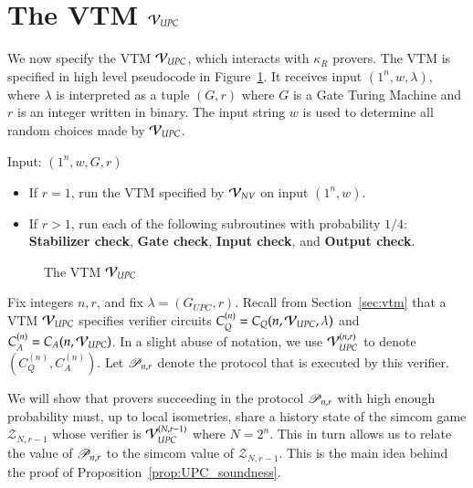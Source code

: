 
\section{The VTM $\mathcal V_{UPC}$}
\label{sec:vtm_upc}

We now specify the VTM $\mathcal V_{UPC}$, which interacts with $\kappa_R$ provers. The VTM is specified in high level pseudocode in Figure~\ref{fig:vtm}. It receives input $(1^n,w,\lambda)$, where $\lambda$ is interpreted as a tuple $(G,r)$ where $G$ is a Gate Turing Machine and $r$ is an integer written in binary. The input string $w$ is used to determine all random choices made by $\mathcal V_{UPC}$.

\begin{center}
\begin{mdframed}
    Input: $(1^n,w,G,r)$
    \begin{itemize}
    	\item If $r = 1$, run the VTM specified by $\mathcal V_{NV}$ on input $(1^n,w)$.
	
		\item If $r > 1$, run each of the following subroutines with probability $1/4$: \textbf{Stabilizer check}, \textbf{Gate check}, \textbf{Input check}, and \textbf{Output check}.
		\end{itemize}
\end{mdframed}

\begin{figure}[H]
\caption{The VTM $\mathcal V_{UPC}$}
\label{fig:vtm}
\end{figure}
\end{center}

Fix integers $n, r$, and fix $\lambda = (G_{UPC},r)$. Recall from Section~\ref{sec:vtm} that a VTM $\mathcal V_{UPC}$ specifies verifier circuits $C_Q^{(n)} = C_Q(n,\mathcal V_{UPC},\lambda)$ and $C_A^{(n)} = C_A(n,\mathcal V_{UPC})$. In a slight abuse of notation, we use $\mathcal V_{UPC}^{(n,r)}$ to denote $(C_Q^{(n)},C_A^{(n)})$. Let $\mathscr{P}_{n,r}$ denote the protocol that is executed by this verifier. 

We will show that provers succeeding in the protocol $\mathscr{P}_{n,r}$ with high enough probability must, up to local isometries, share a history state of the simcom game $\mathscr{Z}_{N,r-1}$ whose verifier is $\mathcal V_{UPC}^{(N,r-1)}$ where $N = 2^n$. This in turn allows us to relate the value of $\mathscr{P}_{n,r}$ to the simcom value of $\mathscr{Z}_{N,r-1}$. This is the main idea behind the proof of Proposition~\ref{prop:UPC_soundness}.



